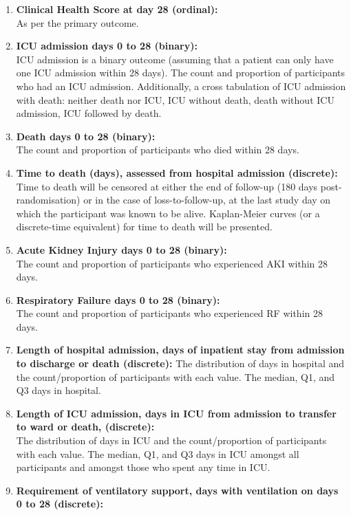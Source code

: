 \documentclass[11pt,parskip=half-]{scrartcl}
\begin{document}
\begin{enumerate}
    \item \textbf{Clinical Health Score at day 28 (ordinal):} \\
        As per the primary outcome.
    \item \textbf{ICU admission days 0 to 28 (binary):} \\
        ICU admission is a binary outcome (assuming that a patient can only have one ICU admission within 28 days). The count and proportion of participants who had an ICU admission. Additionally, a cross tabulation of ICU admission with death: neither death nor ICU, ICU without death, death without ICU admission, ICU followed by death.
    \item \textbf{Death days 0 to 28 (binary):} \\
        The count and proportion of participants who died within 28 days.
    \item \textbf{Time to death (days), assessed from hospital admission (discrete):} \\
        Time to death will be censored at either the end of follow-up (180 days post-randomisation) or in the case of loss-to-follow-up, at the last study day on which the participant was known to be alive. Kaplan-Meier curves (or a discrete-time equivalent) for time to death will be presented.
    \item \textbf{Acute Kidney Injury days 0 to 28 (binary):} \\
        The count and proportion of participants who experienced AKI within 28 days.
    \item \textbf{Respiratory Failure days 0 to 28 (binary):} \\
        The count and proportion of participants who experienced RF within 28 days.
    \item \textbf{Length of hospital admission, days of inpatient stay from admission to discharge or death (discrete):}
        The distribution of days in hospital and the count/proportion of participants with each value. The median, Q1, and Q3 days in hospital.
    \item \textbf{Length of ICU admission, days in ICU from admission to transfer to ward or death, (discrete):} \\
        The distribution of days in ICU and the count/proportion of participants with each value. The median, Q1, and Q3 days in ICU amongst all participants and amongst those who spent any time in ICU.
    \item \textbf{Requirement of ventilatory support, days with ventilation on days 0 to 28 (discrete):} \\

\end{enumerate}
\end{document}
